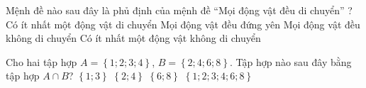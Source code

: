 \documentclass[12pt,a4paper,openany,oneside]{book}
\begin{document}
\begin{ex}%
	Mệnh đề nào sau đây là phủ định của  mệnh đề “Mọi động vật đều di chuyển” ?
	 \choice
		{ Có ít nhất một động vật di  chuyển}
		{ Mọi động vật đều đứng  yên}
		{ Mọi động vật đều không di  chuyển}
		{ \True Có  ít nhất một động vật không di chuyển}
\end{ex}

\begin{ex}%
	Cho hai tập hợp $A=\left\{1;2;3;4\right\}$, $B=\left\{ 2;4;6;8 \right\}$. Tập hợp nào sau đây  bằng tập hợp $A\cap B$?
	 \choice
		{$\left\{1;3 \right\}$}
		 {\True$\left\{ 2;4  \right\}$}
		{$\left\{6;8  \right\}$}
		 {$\left\{1;2;3;4;6;8 \right\}$}
\end{ex}
\end{document}
